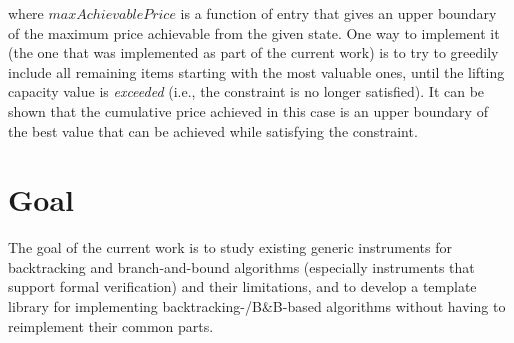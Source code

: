 where $maxAchievablePrice$ is a function of entry that gives an upper boundary of the maximum
price achievable from the given state. One way to implement it (the one that was implemented
as part of the current work) is to try to greedily include all remaining items starting with the
most valuable ones, until the lifting capacity value is \emph{exceeded} (i.e., the constraint
is no longer satisfied). It can be shown that the cumulative price achieved in this case is
an upper boundary of the best value that can be achieved while satisfying the constraint.

\section{Goal}

The goal of the current work is to study existing generic instruments for
backtracking and branch-and-bound algorithms (especially instruments that support formal
verification) and their limitations, and to develop a template library for implementing
backtracking-/B\&B-based algorithms without having to reimplement their common parts.





